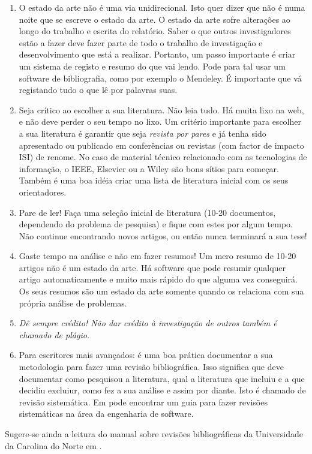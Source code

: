 \begin{enumerate}
  \item O estado da arte não é uma via unidirecional. Isto quer dizer que não é numa noite que se escreve o estado da arte. O estado da arte sofre alterações ao longo do trabalho e escrita do relatório. Saber o que outros investigadores estão a fazer deve fazer parte de todo o trabalho de investigação e desenvolvimento que está a realizar. Portanto, um passo importante é criar um sistema de registo e resumo do que vai lendo. Pode para tal usar um software de bibliografia, como por exemplo o Mendeley. É importante que vá registando tudo o que lê por palavras suas.
  \item Seja crítico ao escolher a sua literatura. Não leia tudo. Há muita lixo na web, e não deve perder o seu tempo no lixo. Um critério importante para escolher a sua literatura é garantir que seja \emph{revista por pares} e já tenha sido apresentado ou publicado em conferências ou revistas (com factor de impacto ISI) de renome. No caso de material técnico relacionado com as tecnologias de informação, o IEEE, Elsevier ou a Wiley são bons sítios para começar. Também é uma boa idéia criar uma lista de literatura inicial com os seus orientadores.
  \item Pare de ler! Faça uma seleção inicial de literatura (10-20 documentos, dependendo do problema de pesquisa) e fique com estes por algum tempo. Não continue encontrando novos artigos, ou então nunca terminará a sua tese!
  \item Gaste tempo na análise e não em fazer resumos! Um mero resumo de 10-20 artigos não é um estado da arte. Há software que pode resumir qualquer artigo automaticamente e muito mais rápido do que alguma vez conseguirá. Os seus resumos são um estado da arte somente quando os relaciona com sua própria análise de problemas.
  \item \emph{Dê sempre crédito! Não dar crédito à investigação de outros também é chamado de plágio.}
  \item Para escritores mais avançados: é uma boa prática documentar a sua metodologia para fazer uma revisão bibliográfica. Isso significa que deve documentar como pesquisou a literatura, qual a literatura que incluiu e a que decidiu excluiur, como fez a sua análise e assim por diante. Isto é chamado de revisão sistemática. Em \cite{Kitchenham2007} pode encontrar um guia para fazer revisões sistemáticas na área da engenharia de software.
\end{enumerate}

Sugere-se ainda a leitura do manual sobre revisões bibliográficas da Universidade da Carolina do Norte em \cite{LiteratureReview2017}.
